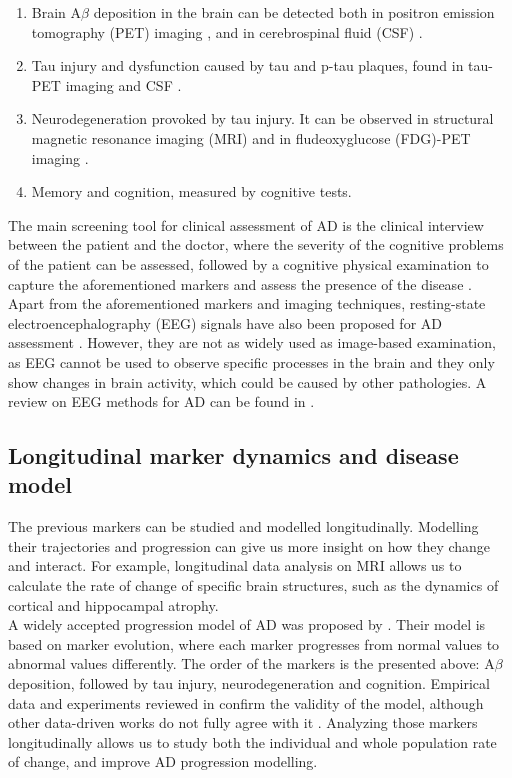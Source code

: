 \begin{enumerate}\itemsep5pt
\item Brain A$\beta$ deposition in the brain can be detected both in positron emission tomography (PET) imaging \cite{Clark2011}, and in cerebrospinal fluid (CSF) \cite{Andreasen1999}.
\item Tau injury and dysfunction caused by tau and p-tau plaques, found in tau-PET imaging and CSF \cite{Andreasen1999,Blennow2010}.
\item Neurodegeneration provoked by tau injury. It can be observed in structural magnetic resonance imaging (MRI) \cite{Weiner2005} and in fludeoxyglucose (FDG)-PET imaging \cite{Chetelat2003}.
\item Memory and cognition, measured by cognitive tests.
\end{enumerate}

The main screening tool for clinical assessment of AD is the clinical interview between the patient and the doctor, where the severity of the cognitive problems of the patient can be assessed, followed by a cognitive physical examination to capture the aforementioned markers and assess the presence of the disease \cite{Lane2018}. \\

Apart from the aforementioned markers and imaging techniques, resting-state electroencephalography (EEG) signals have also been proposed for AD assessment \cite{Al-Qazzaz2014,Bhat2015}. However, they are not as widely used as image-based examination, as EEG cannot be used to observe specific processes in the brain and they only show changes in brain activity, which could be caused by other pathologies. A review on EEG methods for AD can be found in \cite{Houmani2018}.

\subsection{Longitudinal marker dynamics and disease model}

The previous markers can be studied and modelled longitudinally. Modelling their trajectories and progression can give us more insight on how they change and interact. For example, longitudinal data analysis on MRI allows us to calculate the rate of change of specific brain structures, such as the dynamics of cortical and hippocampal atrophy. \\

A widely accepted progression model of AD was proposed by \cite{Jack2010}. Their model is based on marker evolution, where each marker progresses from normal values to abnormal values differently. The order of the markers is the presented above: A$\beta$ deposition, followed by tau injury, neurodegeneration and cognition. Empirical data and experiments reviewed in \cite{Jack2013} confirm the validity of the model, although other data-driven works do not fully agree with it \cite{Iturria-Medina2016}. Analyzing those markers longitudinally allows us to study both the individual and whole population rate of change, and improve AD progression modelling. \\

